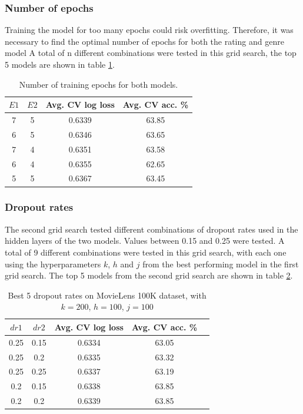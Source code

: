 \subsubsection{Number of epochs}
Training the model for too many epochs could risk overfitting. Therefore, it was necessary to find the optimal number of epochs for both the rating and genre model
A total of n different combinations were tested in this grid search, the top 5 models are shown in table \ref{tab:ml100k-grid-results2}.

\begin{table}[H]
\centering
\begin{tabular}{c | c | c | c}
\toprule
\textbf{$E1$} & \textbf{$E2$} & \textbf{Avg. CV log loss} & \textbf{Avg. CV acc.} \% \\
\midrule
7 & 5 & 0.6339 & 63.85 \\
\midrule
6 & 5 & 0.6346 & 63.65 \\
\midrule
7 & 4 & 0.6351 & 63.58 \\
\midrule
6 & 4 & 0.6355 & 62.65 \\
\midrule
5 & 5 & 0.6367 & 63.45 \\
\bottomrule
\end{tabular}
\caption[MovieLens 100K grid search results -- number of epochs]{Number of training epochs for both models.}
\label{tab:ml100k-grid-results2}
\end{table}

\subsubsection{Dropout rates}
The second grid search tested different combinations of dropout rates used in the hidden layers of the two models. Values between 0.15 and 0.25 were tested. A total of 9 different combinations were tested in this grid search, with each one using the hyperparameters $k$, $h$ and $j$ from the best performing model in the first grid search. The top 5 models from the second grid search are shown in table \ref{tab:ml100k-grid-results3}.

\begin{table}[H]
\centering
\begin{tabular}{c | c | c | c | c}
\toprule
\textbf{$dr1$} & \textbf{$dr2$} & \textbf{Avg. CV log loss} & \textbf{Avg. CV acc.} \% \\
\midrule
0.25 & 0.15 & 0.6334 & 63.05 \\
\midrule
0.25 & 0.2 & 0.6335 & 63.32 \\
\midrule
0.25 & 0.25 & 0.6337 & 63.19 \\
\midrule
0.2 & 0.15 & 0.6338 & 63.85 \\
\midrule
0.2 & 0.2 & 0.6339 & 63.85 \\
\bottomrule
\end{tabular}
\caption[MovieLens 100K grid search results -- dropout rates]{Best 5 dropout rates on MovieLens 100K dataset, with $k=200$, $h=100$, $j=100$}
\label{tab:ml100k-grid-results3}
\end{table}

